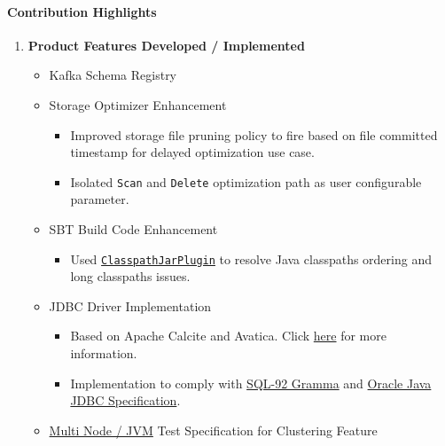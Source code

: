 \documentclass[
]{article}
\providecommand{\tightlist}{%
  \setlength{\itemsep}{0pt}\setlength{\parskip}{0pt}}
\begin{document}
\hypertarget{contribution-highlights-7}{%
\paragraph{Contribution Highlights}\label{contribution-highlights-7}}

\begin{enumerate}
\def\labelenumi{\arabic{enumi}.}
\tightlist
\item
  \textbf{Product Features Developed / Implemented}

  \begin{itemize}
  \tightlist
  \item
    Kafka Schema Registry
  \item
    Storage Optimizer Enhancement

    \begin{itemize}
    \tightlist
    \item
      Improved storage file pruning policy to fire based on file
      committed timestamp for delayed optimization use case.
    \item
      Isolated \texttt{Scan} and \texttt{Delete} optimization path as
      user configurable parameter.
    \end{itemize}
  \item
    SBT Build Code Enhancement

    \begin{itemize}
    \tightlist
    \item
      Used
      \href{http://sbt-native-packager.readthedocs.io/en/latest/recipes/longclasspath.html\#generate-a-classpath-jar}{\texttt{ClasspathJarPlugin}}
      to resolve Java classpaths ordering and long classpaths issues.
    \end{itemize}
  \item
    JDBC Driver Implementation

    \begin{itemize}
    \tightlist
    \item
      Based on Apache Calcite and Avatica. Click
      \protect\hyperlink{apache-calcite-avatica}{here} for more
      information.
    \item
      Implementation to comply with
      \href{https://en.wikipedia.org/wiki/SQL-92}{SQL-92 Gramma} and
      \href{http://download.oracle.com/otndocs/jcp/jdbc-4_1-mrel-spec/index.html}{Oracle
      Java JDBC Specification}.
    \end{itemize}
  \item
    \href{http://doc.akka.io/docs/akka/snapshot/dev/multi-node-testing.html}{Multi
    Node / JVM} Test Specification for Clustering Feature


\end{itemize}
\end{enumerate}
\end{document}
